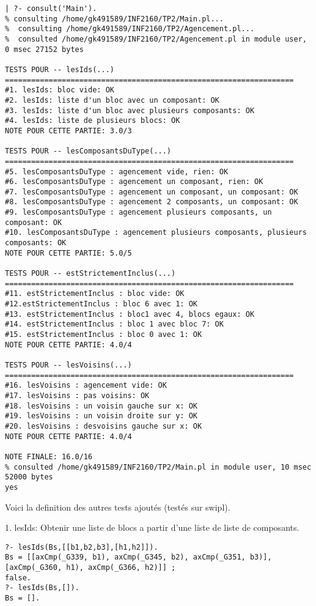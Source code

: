 \documentclass[letterpaper,11pt]{letter}
\begin{document}
\begin{verbatim}
| ?- consult('Main').
% consulting /home/gk491589/INF2160/TP2/Main.pl...
%  consulting /home/gk491589/INF2160/TP2/Agencement.pl...
%  consulted /home/gk491589/INF2160/TP2/Agencement.pl in module user, 0 msec 27152 bytes

TESTS POUR -- lesIds(...)
==================================================================
#1. lesIds: bloc vide: OK
#2. lesIds: liste d'un bloc avec un composant: OK
#3. lesIds: liste d'un bloc avec plusieurs composants: OK
#4. lesIds: liste de plusieurs blocs: OK
NOTE POUR CETTE PARTIE: 3.0/3

TESTS POUR -- lesComposantsDuType(...)
==================================================================
#5. lesComposantsDuType : agencement vide, rien: OK
#6. lesComposantsDuType : agencement un composant, rien: OK
#7. lesComposantsDuType : agencement un composant, un composant: OK
#8. lesComposantsDuType : agencement 2 composants, un composant: OK
#9. lesComposantsDuType : agencement plusieurs composants, un composant: OK
#10. lesComposantsDuType : agencement plusieurs composants, plusieurs composants: OK
NOTE POUR CETTE PARTIE: 5.0/5

TESTS POUR -- estStrictementInclus(...)
==================================================================
#11. estStrictementInclus : bloc vide: OK
#12.estStrictementInclus : bloc 6 avec 1: OK
#13. estStrictementInclus : bloc1 avec 4, blocs egaux: OK
#14. estStrictementInclus : bloc 1 avec bloc 7: OK
#15. estStrictementInclus : bloc 0 avec 1: OK
NOTE POUR CETTE PARTIE: 4.0/4

TESTS POUR -- lesVoisins(...)
==================================================================
#16. lesVoisins : agencement vide: OK
#17. lesVoisins : pas voisins: OK
#18. lesVoisins : un voisin gauche sur x: OK
#19. lesVoisins : un voisin droite sur y: OK
#20. lesVoisins : desvoisins gauche sur x: OK
NOTE POUR CETTE PARTIE: 4.0/4

NOTE FINALE: 16.0/16
% consulted /home/gk491589/INF2160/TP2/Main.pl in module user, 10 msec 52000 bytes
yes
\end{verbatim}

Voici la definition des autres tests ajoutés (testés sur swipl).

1. lesIds: Obtenir une liste de blocs a partir d'une liste de liste de composants.
\begin{Verbatim}[fontsize=\small]
?- lesIds(Bs,[[b1,b2,b3],[h1,h2]]).
Bs = [[axCmp(_G339, b1), axCmp(_G345, b2), axCmp(_G351, b3)], [axCmp(_G360, h1), axCmp(_G366, h2)]] ;
false.
?- lesIds(Bs,[]).
Bs = [].
\end{Verbatim}
\end{document}
